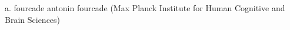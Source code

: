 
                {a. fourcade}
                {antonin fourcade (Max Planck Institute for Human Cognitive and Brain Sciences)}
                